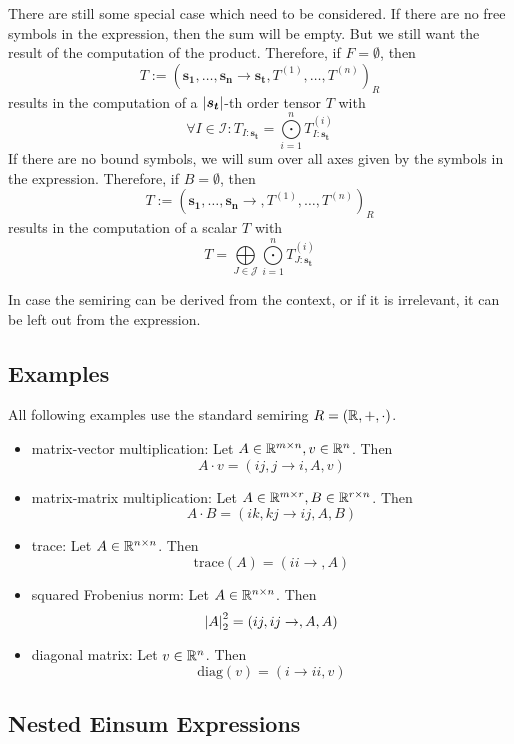 \begin{definition}
    There are still some special case which need to be considered.
    If there are no free symbols in the expression, then the sum will be empty.
    But we still want the result of the computation of the product.
    Therefore, if $F = \emptyset$, then
    $$T := (\bm{s_1},\dots,\bm{s_n} \rightarrow \bm{s_t}, T^{(1)},\dots,T^{(n)})_R$$
    results in the computation of a $\left| \bm{s_t} \right|$-th order tensor $T$ with
    $$\forall I \in \mathcal{I}: T_{I: \bm{s_t}} = \bigodot\limits_{i = 1}^{n} T^{(i)}_{I:\bm{s_t}}$$
    If there are no bound symbols, we will sum over all axes given by the symbols in the expression.
    Therefore, if $B = \emptyset$, then
    $$T := (\bm{s_1},\dots,\bm{s_n} \rightarrow , T^{(1)},\dots,T^{(n)})_R$$
    results in the computation of a scalar $T$ with
    $$T = \bigoplus\limits_{J \in \mathcal{J}} \bigodot\limits_{i = 1}^{n} T^{(i)}_{J:\bm{s_t}}$$

    In case the semiring can be derived from the context, or if it is irrelevant, it can be left out from the expression.
\end{definition}

\subsection{Examples}
All following examples use the standard semiring $R = (\mathbb{R}, +, \cdot)$.
\begin{itemize}
    \item matrix-vector multiplication: Let $A \in \mathbb{R}^{m \times n}, v \in \mathbb{R}^{n}$. Then
          $$A \cdot v = (ij, j \rightarrow i, A, v)$$
    \item matrix-matrix multiplication: Let $A \in \mathbb{R}^{m \times r}, B \in \mathbb{R}^{r \times n}$. Then
          $$A \cdot B = (ik, kj \rightarrow ij, A, B)$$
    \item trace: Let $A \in \mathbb{R}^{n \times n}$. Then
          $$\text{trace}(A) = (ii \rightarrow, A)$$
    \item squared Frobenius norm: Let $A \in \mathbb{R}^{n \times n}$. Then
          $$\left| A \right|_2^2 = (ij, ij \rightarrow,A,A)$$
    \item diagonal matrix: Let $v \in \mathbb{R}^{n}$. Then
          $$\text{diag}(v) = (i \rightarrow ii, v)$$
\end{itemize}

\subsection{Nested Einsum Expressions}

